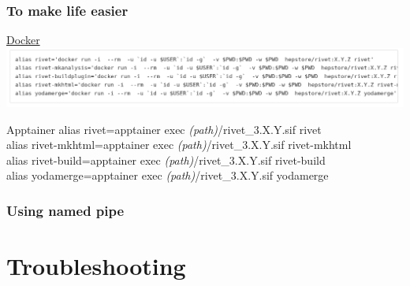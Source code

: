 \documentclass{beamer}
\begin{document}
\begin{frame}
	\frametitle{To make life easier}
	\begin{block}{\href{https://gitlab.com/hepcedar/rivet/-/blob/release-3-1-x/doc/tutorials/docker.md\#running-rivet-through-docker}{Docker}}
\includegraphics[width=\linewidth]{dockerAlias.png}
		
	\end{block}

	\begin{exampleblock}{Apptainer}
		alias rivet=\textquotesingle apptainer exec \textit{(path)}/rivet\_3.X.Y.sif rivet\textquotesingle \\
		alias rivet-mkhtml=\textquotesingle apptainer exec \textit{(path)}/rivet\_3.X.Y.sif rivet-mkhtml\textquotesingle \\
		alias rivet-build=\textquotesingle apptainer exec \textit{(path)}/rivet\_3.X.Y.sif rivet-build\textquotesingle \\
		alias yodamerge=\textquotesingle apptainer exec \textit{(path)}/rivet\_3.X.Y.sif yodamerge\textquotesingle \\
	\end{exampleblock}
\end{frame}

\begin{frame}
 \frametitle{Using named pipe}
\end{frame}


\section{Troubleshooting}
\end{document}
